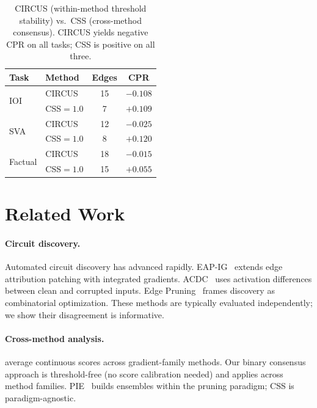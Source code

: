 \documentclass[11pt,a4paper]{article}
\newcommand{\css}{\textsc{CSS}}
\begin{document}
\begin{table}[t]
\centering
\small
\begin{tabular}{llcc}
\toprule
\textbf{Task} & \textbf{Method} & \textbf{Edges} & \textbf{CPR} \\
\midrule
\multirow{2}{*}{IOI} & CIRCUS & 15 & $-0.108$ \\
 & \css{}$=1.0$ & 7 & $+0.109$ \\
\midrule
\multirow{2}{*}{SVA} & CIRCUS & 12 & $-0.025$ \\
 & \css{}$=1.0$ & 8 & $+0.120$ \\
\midrule
\multirow{2}{*}{Factual} & CIRCUS & 18 & $-0.015$ \\
 & \css{}$=1.0$ & 15 & $+0.055$ \\
\bottomrule
\end{tabular}
\caption{CIRCUS (within-method threshold stability) vs.\ \css{} (cross-method consensus). CIRCUS yields negative CPR on all tasks; CSS is positive on all three.}
\label{tab:circus}
\end{table}

\section{Related Work}

\paragraph{Circuit discovery.}
Automated circuit discovery has advanced rapidly.
EAP-IG~\cite{syed2023attribution} extends edge attribution patching with integrated gradients.
ACDC~\cite{conmy2023towards} uses activation differences between clean and corrupted inputs.
Edge Pruning~\cite{li2024circuit} frames discovery as combinatorial optimization.
These methods are typically evaluated independently; we show their disagreement is informative.

\paragraph{Cross-method analysis.}
\citet{mondorf2025crossmethod} average continuous scores across gradient-family methods.
Our binary consensus approach is threshold-free (no score calibration needed) and applies across method families.
PIE~\cite{pie2024} builds ensembles within the pruning paradigm; CSS is paradigm-agnostic.
\end{document}
